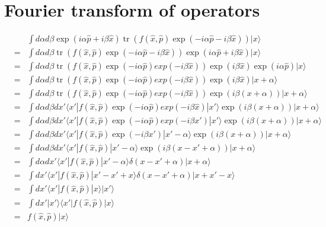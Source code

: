 \documentclass[12pt]{article}
\begin{document}
\section{Fourier transform of operators}
\begin{eqnarray}&& \int d\alpha d\beta\exp(i\alpha\hat{p}+i\beta\hat{x})\operatorname{tr}(f(\hat{x},\hat{p})\exp(-i\alpha\hat{p}-i\beta\hat{x}))|x\rangle \\
&=& \int d\alpha d\beta\operatorname{tr}(f(\hat{x},\hat{p})\exp(-i\alpha\hat{p}-i\beta\hat{x}))\exp(i\alpha\hat{p}+i\beta\hat{x})|x\rangle \\
&=& \int d\alpha d\beta\operatorname{tr}(f(\hat{x},\hat{p})\exp(-i\alpha\hat{p})exp(-i\beta\hat{x}))\exp(i\beta\hat{x})\exp(i\alpha\hat{p})|x\rangle \\
&=& \int d\alpha d\beta\operatorname{tr}(f(\hat{x},\hat{p})\exp(-i\alpha\hat{p})exp(-i\beta\hat{x}))\exp(i\beta\hat{x})|x+\alpha\rangle \\
&=& \int d\alpha d\beta\operatorname{tr}(f(\hat{x},\hat{p})\exp(-i\alpha\hat{p})exp(-i\beta\hat{x}))\exp(i\beta(x+\alpha))|x+\alpha\rangle \\
&=& \int d\alpha d\beta dx'\langle x'|f(\hat{x},\hat{p})\exp(-i\alpha\hat{p})exp(-i\beta\hat{x})|x'\rangle\exp(i\beta(x+\alpha))|x+\alpha\rangle \\
&=& \int d\alpha d\beta dx'\langle x'|f(\hat{x},\hat{p})\exp(-i\alpha\hat{p})exp(-i\beta x')|x'\rangle\exp(i\beta(x+\alpha))|x+\alpha\rangle \\
&=& \int d\alpha d\beta dx'\langle x'|f(\hat{x},\hat{p})\exp(-i\beta x')|x'-\alpha\rangle\exp(i\beta(x+\alpha))|x+\alpha\rangle \\
&=& \int d\alpha d\beta dx'\langle x'|f(\hat{x},\hat{p})|x'-\alpha\rangle\exp(i\beta(x-x'+\alpha))|x+\alpha\rangle \\
&=& \int d\alpha dx'\langle x'|f(\hat{x},\hat{p})|x'-\alpha\rangle\delta(x-x'+\alpha)|x+\alpha\rangle \\
&=& \int dx'\langle x'|f(\hat{x},\hat{p})|x'-x'+x\rangle\delta(x-x'+\alpha)|x+x'-x\rangle \\
&=& \int dx'\langle x'|f(\hat{x},\hat{p})|x\rangle|x'\rangle \\
&=& \int dx'|x'\rangle\langle x'|f(\hat{x},\hat{p})|x\rangle \\
&=& f(\hat{x},\hat{p})|x\rangle \\
\end{eqnarray}
\end{document}
